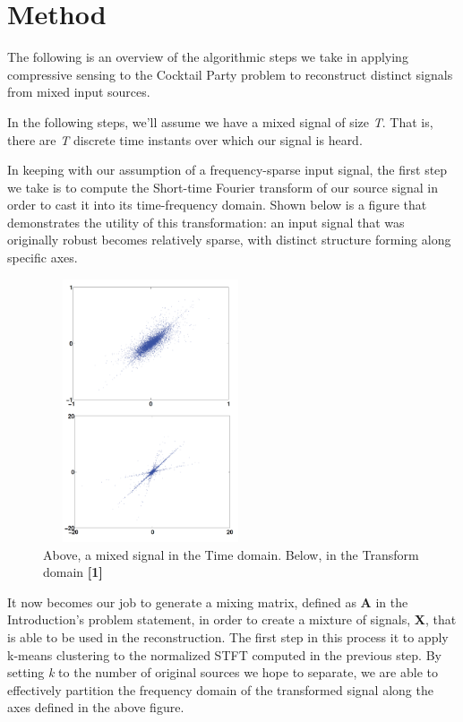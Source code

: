 \documentclass{article}
\begin{document}
\section{Method}
The following is an overview of the algorithmic steps we take in applying compressive sensing to the Cocktail Party problem to reconstruct distinct signals from mixed input sources.

In the following steps, we'll assume we have a mixed signal of size \textit{T}. That is, there are \textit{T} discrete time instants over which our signal is heard.

In keeping with our assumption of a frequency-sparse input signal, the first step we take is to compute the Short-time Fourier transform of our source signal in order to cast it into its time-frequency domain. Shown below is a figure that demonstrates the utility of this transformation: an input signal that was originally robust becomes relatively sparse, with distinct structure forming along specific axes.

\begin{figure}[H]
	\centering
	\includegraphics[width=180pt, height=220pt]{figs/transform_domain.png}
	\caption{Above, a mixed signal in the Time domain. Below, in the Transform domain \textbf{[1]}}
	\label{Signal in each Domain}
\end{figure}

It now becomes our job to generate a mixing matrix, defined as \textbf{A} in the Introduction's problem statement, in order to create a mixture of signals, \textbf{X}, that is able to be used in the reconstruction. The first step in this process it to apply k-means clustering to the normalized STFT computed in the previous step. By setting \textit{k} to the number of original sources we hope to separate, we are able to effectively partition the frequency domain of the transformed signal along the axes defined in the above figure.
\end{document}
